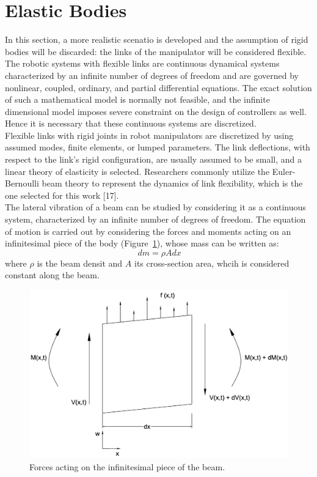 \documentclass[a4paper,12pt,oneside]{report}
\begin{document}
\section{Elastic Bodies}
In this section, a more realistic scenatio is developed and the assumption of rigid bodies will be discarded: the links of the manipulator will be considered flexible.\\
The robotic systems with flexible links are continuous dynamical systems characterized by an infinite number of degrees of freedom and are governed by nonlinear, coupled, ordinary, and partial differential equations. The exact solution of such a mathematical model is normally not feasible, and the infinite dimensional model imposes severe constraint on the design of controllers as well. Hence it is necessary that these continuous systems are discretized. \\
Flexible links with rigid joints in robot manipulators are discretized by using assumed modes, finite elements, or lumped parameters. The link deflections, with respect to the link’s rigid configuration, are usually assumed to be small, and a linear theory of elasticity is selected. Researchers commonly utilize the Euler-Bernoulli beam theory to represent the dynamics of link flexibility, which is the one selected for this work [17].\\
The lateral vibration of a beam can be studied by considering it as a continuous system, characterized by an infinite number of degrees of freedom. The equation of motion is carried out by considering the forces and moments acting on an infinitesimal piece of the body (Figure~\ref{elementary}), whose mass can be written as:
\begin{equation}
\,dm=\rho Adx
\end{equation}
where $\rho$ is the beam densit and $A$ its cross-section area, whcih is considered constant along the beam.\\
\begin{figure}[h]
\centering
\includegraphics[scale=0.25]{elementary}
\caption{Forces acting on the infinitesimal piece of the beam.}
\label{elementary}
\end{figure}
\end{document}
